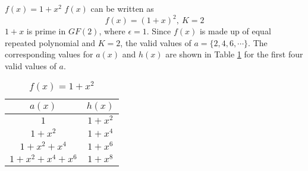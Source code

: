 \begin{example}
$f(x)=1+x^2$\newline
$f(x)$ can be written as $$f(x)=(1+x)^2,~K=2$$ $1+x$ is prime in $GF(2)$, where $\epsilon =1$. Since $f(x)$ is made up of equal repeated polynomial and $K=2$, the valid values of $a=\{2,4,6,\cdots \}$.
The corresponding values for $a(x)$ and $h(x)$ are shown in Table \ref{novelTab1} for the first four valid values of $a$.
\begin{table}[htbp]
\renewcommand{\arraystretch}{1.3}
 \caption{$f(x)=1+x^2$}
 \centering
\begin{tabular}{c c } 
\hline
 $a(x)$ & $h(x)$ \\ [0.5ex] 
\hline\hline
$1$ & $1+x^2$\\ 
$1+x^2$ & $1+x^4$ \\
$1+x^2+x^4$ & $1+x^6$\\
$1+x^2+x^4+x^6$ & $1+x^8$ 
\end{tabular}
 \label{novelTab1}
\end{table}
\end{example}





